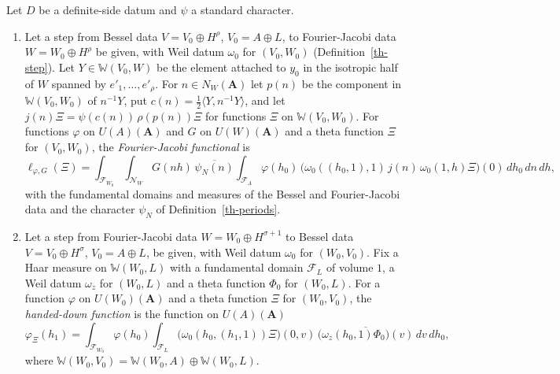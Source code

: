 \begin{definition}\label{th-step-periods}
Let $D$ be a definite-side datum and $\psi$ a standard character.
\begin{enumerate}
\item Let a step from Bessel data $V=V_0\oplus H^\rho$, $V_0=A\oplus L$, to
  Fourier-Jacobi data $W=W_0\oplus H^\rho$ be given, with Weil datum $\omega_0$
  for $(V_0,W_0)$ (Definition~\ref{th-step}). Let $Y\in\mathbb W(V_0,W)$ be the
  element attached to $y_0$ in the isotropic half of $W$ spanned by
  $e'_1,\ldots,e'_\rho$. For $n\in N_W(\mathbf A)$ let $p(n)$ be the component in
  $\mathbb W(V_0,W_0)$ of $n^{-1}Y$, put
  $c(n)=\tfrac12\langle Y,n^{-1}Y\rangle$, and let
  $j(n)\Xi=\psi(c(n))\,\rho(p(n))\Xi$ for functions $\Xi$ on
  $\mathbb W(V_0,W_0)$. For functions $\varphi$ on $U(A)(\mathbf A)$ and $G$ on
  $U(W)(\mathbf A)$ and a theta function $\Xi$ for $(V_0,W_0)$, the
  \emph{Fourier-Jacobi functional} is
  \[
  \ell_{\varphi,G}(\Xi)=\int_{\mathcal F_{W_0}}\int_{\mathcal N_W}G(nh)\,
  \overline{\psi_N(n)}\int_{\mathcal F_A}\varphi(h_0)\,
  \bigl(\omega_0((h_0,1),1)\,j(n)\,\omega_0(1,h)\Xi\bigr)(0)\,dh_0\,dn\,dh ,
  \]
  with the fundamental domains and measures of the Bessel and Fourier-Jacobi
  data and the character $\psi_N$ of Definition~\ref{th-periods}.
\item Let a step from Fourier-Jacobi data $W=W_0\oplus H^{\sigma+1}$ to Bessel
  data $V=V_0\oplus H^\sigma$, $V_0=A\oplus L$, be given, with Weil datum
  $\omega_0$ for $(W_0,V_0)$. Fix a Haar measure on $\mathbb W(W_0,L)$ with a
  fundamental domain $\mathcal F_L$ of volume $1$, a Weil datum $\omega_z$ for
  $(W_0,L)$ and a theta function $\Phi_0$ for $(W_0,L)$. For a function
  $\varphi$ on $U(W_0)(\mathbf A)$ and a theta function $\Xi$ for $(W_0,V_0)$,
  the \emph{handed-down function} is the function on $U(A)(\mathbf A)$
  \[
  \varphi_\Xi(h_1)=\int_{\mathcal F_{W_0}}\varphi(h_0)\int_{\mathcal F_L}
  \bigl(\omega_0(h_0,(h_1,1))\Xi\bigr)(0,v)\,
  \overline{\bigl(\omega_z(h_0,1)\Phi_0\bigr)(v)}\,dv\,dh_0 ,
  \]
  where $\mathbb W(W_0,V_0)=\mathbb W(W_0,A)\oplus\mathbb W(W_0,L)$.
\end{enumerate}
\end{definition}

